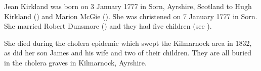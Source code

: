
Jean Kirkland was born on 3 January 1777 in Sorn, Ayrshire, Scotland \cite{JKirklandBirth} to Hugh Kirkland () and Marion McGie (). She was christened on 7 January 1777 in Sorn.
She married Robert Dunsmore () and they had five children (see ). 

She died during the cholera epidemic which swept the Kilmarnock area in 1832, as did her son James and his wife and two of their children.\cite{DRDunsmoreDeath} They are all buried in the cholera graves in Kilmarnock, Ayrshire.


